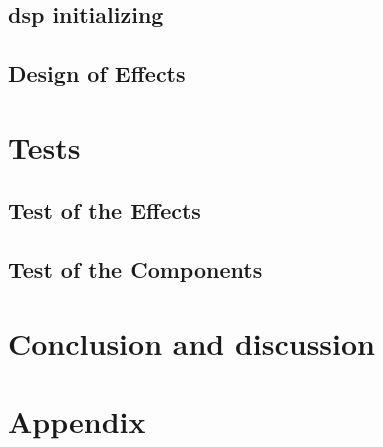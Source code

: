 \chapter{\gls{dsp} initializing}

\chapter{Design of Effects}



%

 \graphicspath{{figures/tests/}}
\part{Tests}\label{pt:tests}
\chapter{Test of the Effects}



\chapter{Test of the Components}

 
\part{Conclusion and discussion}\label{pt:conclusions}
 
%

\glsresetall
\appendix %

 \graphicspath{{figures/appendix/}}
\part{Appendix}\label{pt:appendix}









